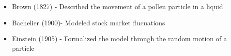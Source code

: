 \documentclass[../chapter01.tex]{subfile}
\begin{document}
\begin{itemize}
  \item Brown (1827) - Described the movement of a pollen particle in a liquid
  \item Bachelier (1900)- Modeled stock market flucuations
  \item Einstein (1905) - Formalized the model through the random motion of a particle
\end{itemize}
\end{document}
